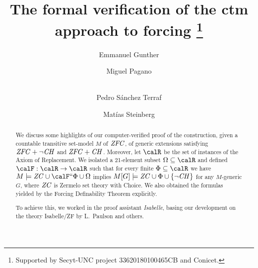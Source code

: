 \documentclass[runningheads]{llncs}
\begin{document}
%
\title{The formal verification of the ctm approach to forcing%
  \thanks{Supported by Secyt-UNC project 33620180100465CB and Conicet.}%
}
%
%
\author{Emmanuel Gunther \and
Miguel Pagano \and \\
Pedro Sánchez Terraf%
\and
Matías Steinberg
}
%
%
%
\maketitle              %
%
\begin{abstract}
  We discuss some highlights of our computer-verified
  proof of the construction, given a countable transitive set-model $M$
  of $\mathit{ZFC}$, of generic extensions  satisfying $\mathit{ZFC}+\neg\mathit{CH}$ and $\mathit{ZFC}+\mathit{CH}$.
  Moreover, let $\calR$ be the set of instances of the Axiom of
  Replacement. We isolated a 21-element subset $\Omega\sbq\calR$ and
  defined $\calF:\calR\to\calR$
  such that for every finite $\Phi\sbq\calR$
  we have
  $M\models \ZC \cup \calF\dimg\Phi \cup \Omega$ implies
  $M[G]\models \mathit{ZC} \cup \Phi \cup \{ \neg \mathit{CH} \}$ for any $M$-generic $G$, where $\mathit{ZC}$ is
  Zermelo set theory with Choice.
  We also obtained the formulas yielded by the Forcing Definability Theorem
  explicitly.

  To achieve this, we worked in the proof assistant \emph{Isabelle},
  basing our development on the theory Isabelle/ZF by L.~Paulson and
  others.

\end{abstract}
%
%
%

 
\end{document}
